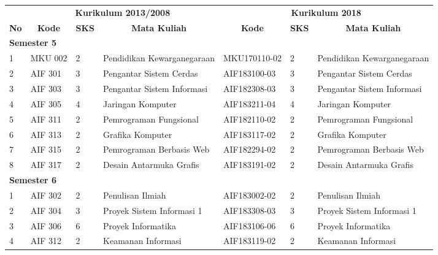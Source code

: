 \documentclass[a4paper,twoside]{article}
\begin{document}
\begin{enumerate}
\begin{enumerate}
\begin{itemize}
						\begin{table}[H]
						\centering
						\label{tab:aturankonversiwajib_3}
						\begin{tabular}{|p{0.35cm}|p{2cm}|p{0.55cm}|p{3.45cm}|p{2.65cm}|p{0.55cm}|p{3.45cm}|}
						\hline
						\multicolumn{1}{|c|}{} & \multicolumn{3}{c|}{\textbf{Kurikulum 2013/2008}} & \multicolumn{3}{c|}{\textbf{Kurikulum 2018}} \\ \cline{2-7} 
						\multicolumn{1}{|c|}{\multirow{-2}{*}{\textbf{No}}} & \multicolumn{1}{c|}{\textbf{Kode}} & \multicolumn{1}{c|}{\textbf{SKS}} & \multicolumn{1}{c|}{\textbf{Mata Kuliah}} & \multicolumn{1}{c|}{\textbf{Kode}} & \multicolumn{1}{c|}{\textbf{SKS}} & \multicolumn{1}{c|}{\textbf{Mata Kuliah}} \\ \hline
						\multicolumn{7}{|l|}{\textbf{Semester 5}} \\ \hline
						1 & MKU 002 & 2 & Pendidikan Kewarganegaraan & MKU170110-02 & 2 & Pendidikan Kewarganegaraan \\ \hline
						2 & AIF 301 & 3 & Pengantar Sistem Cerdas & AIF183100-03 & 3 & Pengantar Sistem Cerdas \\ \hline
						3 & AIF 303 & 3 & Pengantar Sistem Informasi & AIF182308-03 & 3 & Pengantar Sistem Informasi \\ \hline
						4 & AIF 305 & 4 & Jaringan Komputer & AIF183211-04 & 4 & Jaringan Komputer \\ \hline
						5 & AIF 311 & 2 & Pemrograman Fungsional & AIF182110-02 & 2 & Pemrograman Fungsional \\ \hline
						6 & AIF 313 & 2 & Grafika Komputer & AIF183117-02 & 2 & Grafika Komputer \\ \hline
						7 & AIF 315 & 2 & Pemrograman Berbasis Web & AIF182294-02 & 2 & Pemrograman Berbasis Web \\ \hline
						8 & AIF 317 & 2 & Desain Antarmuka Grafis & AIF183191-02 & 2 & Desain Antarmuka Grafis \\ \hline
						\multicolumn{7}{|l|}{\textbf{Semester 6}} \\ \hline
						1 & AIF 302 & 2 & Penulisan Ilmiah & AIF183002-02 & 2 & Penulisan Ilmiah \\ \hline
						2 & AIF 304 & 3 & Proyek Sistem Informasi 1 & AIF183308-03 & 3 & Proyek Sistem Informasi 1 \\ \hline
						3 & AIF 306 & 6 & Proyek Informatika & AIF183106-06 & 6 & Proyek Informatika \\ \hline
						4 & AIF 312 & 2 & Keamanan Informasi & AIF183119-02 & 2 & Keamanan Informasi \\ \hline

\end{tabular}
\end{table}
\end{itemize}
\end{enumerate}
\end{enumerate}
\end{document}
